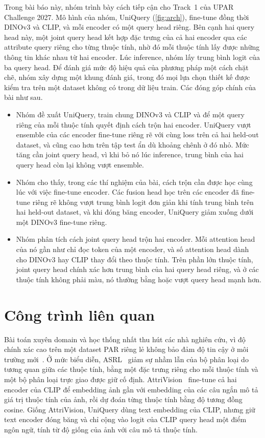 \documentclass[10pt,twocolumn,letterpaper]{article}
\begin{document}
Trong bài báo này, nhóm trình bày cách tiếp cận cho Track~1 của UPAR Challenge 2027. Mô hình của nhóm, UniQuery (\cref{fig:arch}), fine-tune đồng thời DINOv3 và CLIP, và mỗi encoder có một query head riêng. Bên cạnh hai query head này, một joint query head kết hợp đặc trưng của cả hai encoder qua các attribute query riêng cho từng thuộc tính, nhờ đó mỗi thuộc tính lấy được những thông tin khác nhau từ hai encoder. Lúc inference, nhóm lấy trung bình logit của ba query head. Để đánh giá mức độ hiệu quả của phương pháp một cách chặt chẽ, nhóm xây dựng một khung đánh giá, trong đó mọi lựa chọn thiết kế được kiểm tra trên một dataset không có trong dữ liệu train. Các đóng góp chính của bài như sau.
\begin{itemize}
\item Nhóm đề xuất UniQuery, train chung DINOv3 và CLIP và để một query riêng của mỗi thuộc tính quyết định cách trộn hai encoder. UniQuery vượt ensemble của các encoder fine-tune riêng rẽ với cùng loss trên cả hai held-out dataset, và cũng cao hơn trên tập test ẩn dù khoảng chênh ở đó nhỏ. Mức tăng cần joint query head, vì khi bỏ nó lúc inference, trung bình của hai query head còn lại không vượt ensemble.
\item Nhóm cho thấy, trong các thí nghiệm của bài, cách trộn cần được học cùng lúc với việc fine-tune encoder. Các fusion head học trên các encoder đã fine-tune riêng rẽ không vượt trung bình logit đơn giản khi tính trung bình trên hai held-out dataset, và khi đóng băng encoder, UniQuery giảm xuống dưới một DINOv3 fine-tune riêng.
\item Nhóm phân tích cách joint query head trộn hai encoder. Mỗi attention head của nó gần như chỉ đọc token của một encoder, và số attention head dành cho DINOv3 hay CLIP thay đổi theo thuộc tính. Trên phần lớn thuộc tính, joint query head chính xác hơn trung bình của hai query head riêng, và ở các thuộc tính không phải màu, nó thường bằng hoặc vượt query head mạnh hơn.
\end{itemize}

\section{Công trình liên quan}
\label{sec:related}

Bài toán xuyên domain và học thống nhất thu hút các nhà nghiên cứu, vì độ chính xác cao trên một dataset PAR riêng lẻ không bảo đảm độ tin cậy ở môi trường mới~\cite{upar,rethinkpar}. Ở mức biểu diễn, ASRL~\cite{asrl} giảm sự nhầm lẫn của bộ phân loại do tương quan giữa các thuộc tính, bằng một đặc trưng riêng cho mỗi thuộc tính và một bộ phân loại trực giao được giữ cố định. AttriVision~\cite{attrivision} fine-tune cả hai encoder của CLIP để embedding ảnh gần với embedding của các câu ngắn mô tả giá trị thuộc tính của ảnh, rồi dự đoán từng thuộc tính bằng độ tương đồng cosine. Giống AttriVision, UniQuery dùng text embedding của CLIP, nhưng giữ text encoder đóng băng và chỉ cộng vào logit của CLIP query head một điểm ngôn ngữ, tính từ độ giống của ảnh với câu mô tả thuộc tính.
\end{document}
